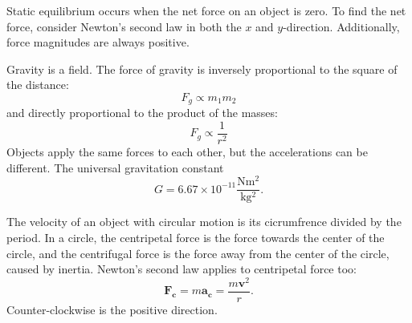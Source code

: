 \documentclass{article}
\begin{document}
Static equilibrium occurs when the net force on an object is zero.
To find the net force, consider Newton's second law in both the $x$ and $y$-direction. 
Additionally, force magnitudes are always positive. 

Gravity is a field. The force of gravity is inversely proportional to the square of the distance:
\[
F_g \propto m_1m_2 
\]
and directly proportional to the product of the masses:
\[
F_g \propto \frac{1}{r^2}
\]
Objects apply the same forces to each other, but the accelerations can be different.
The universal gravitation constant 
\[
G = 6.67 \times 10^{-11} \frac{\mathrm{Nm^2}}{\mathrm{kg^2}}.
\] 

The velocity of an object with circular motion is its cicrumfrence divided by the period.
In a circle, the centripetal force is the force towards the center of the circle,
and the centrifugal force is the force away from the center of the circle, caused by inertia.
Newton's second law applies to centripetal force too:
\[
\mathbf{F_c} = m\mathbf{a_c} = \frac{m\mathbf{v}^2}{r}.
\]
Counter-clockwise is the positive direction. 
\end{document}
